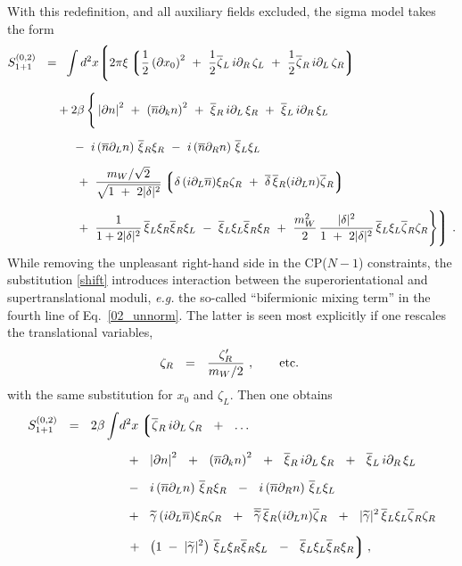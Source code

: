 \documentclass[12pt]{article}
\newcommand{\p}{\partial}
\newcommand{\wt}{\widetilde}
\newcommand{\ov}{\overline}
\newcommand{\lgr}{\left\lgroup}
\newcommand{\rgr}{\right\rgroup}
\newcommand{\bxir}{\ov{\xi}{}_R}
\newcommand{\bxil}{\ov{\xi}{}_L}
\newcommand{\xir}{\xi_R}
\newcommand{\xil}{\xi_L}
\newcommand{\bzl}{\ov{\zeta}{}_L}
\newcommand{\bzr}{\ov{\zeta}{}_R}
\newcommand{\zr}{\zeta_R}
\newcommand{\zl}{\zeta_L}
\newcommand{\nbar}{\ov{n}}
\newcommand{\tgamma}{\wt{\gamma}}
\begin{document}
	With this redefinition, and all auxiliary fields excluded, the sigma model takes the form
\begin{align}
%
\notag
S_{1+1}^{(0,2)} ~~=&~~
	\int d^2 x 
\Biggl\lgroup
	2\pi\xi \lgr \frac 1 2 \left (\p x_0\right)^2 ~+~
		      \frac 1 2 \bzl\, i\p_R\, \zl ~+~
			\frac 1 2 \bzr\, i\p_L\, \zr
		\rgr
	 \\[2mm]
%
\label{02_unnorm}
&
	+2\beta\, \Bigg\{
	\left|\p n\right|^2 ~+~ \left(\ov{n}\p_k n\right)^2 ~+~
	\bxir \, i\p_L \, \xir  ~+~ \bxil \, i\p_R \, \xil \\[2mm]
%
\notag
&
	~~~~
	-~
	i \left(\ov{n}\p_L n\right)\, \bxir \xir ~-~ 
	i \left(\ov{n}\p_R n\right)\, \bxil \xil 
	\\[2mm]
%
\notag
&
	~~~~
	~+~
	\frac{m_W/\sqrt{2}} { \sqrt{ 1~+~2|\delta|^2 } }
	\lgr \delta\, (i\p_L \ov{n}) \xir\zr ~+~ 
             \ov{\delta}\, \bxir (i\p_L n)\bzr 
	\rgr \\[2mm]
%
\notag
&
	~~~~
	~+~ \frac{1}{1 + 2|\delta|^2}\, \bxil\xir \bxir\xil 
	~-~ \bxil\xil\bxir\xir
	~+~
	\frac{m_W^2}{2}\,\frac{|\delta|^2}{1 ~+~ 2|\delta|^2}\,
		\bxil\xil\bzr\zr \Bigg\} 
\Biggr\rgroup~.
\end{align}
	While removing the unpleasant right-hand side in the CP($N-1$) constraints, the
	substitution \eqref{shift} introduces interaction between the superorientational
	and supertranslational moduli, {\it e.g.} the so-called ``bifermionic mixing term''
	in the fourth line of Eq.~\eqref{02_unnorm}.
	The latter is seen most explicitly if one rescales the translational variables,
\[
	\zr ~~=~~ \frac {\zr'}  {{m_W}/{2}}~, \qquad {\rm etc.}~
\]
	with the same substitution for $ x_0 $ and $ \zl $.
	Then one obtains 
\begin{align}
%
\notag
S_{1+1}^{(0,2)} ~~=~~ 2\beta
	\int & d^2 x 
\lgr
	\bzr\, i\p_L\, \zr ~~+~~ \dots 
\right.
	\\[2mm]
%
\label{world02}
	&
	\;\;
	+~~
	\left|\p n\right|^2 ~~+~~ \left(\ov{n}\p_k n\right)^2 ~~+~~
	\bxir \, i\p_L \, \xir  ~~+~~ \bxil \, i\p_R \, \xil 
	\\[2mm]
%
\notag
	&
	\;\;
	-~~
	i \left(\ov{n}\p_L n\right)\, \bxir \xir ~~-~~ 
	i \left(\ov{n}\p_R n\right)\, \bxil \xil  
	\\[2mm]
%
\notag
	&
	\;\;
	+~~
	\tgamma\, (i\p_L\nbar) \xir\zr ~~+~~ \ov{\tgamma}\, \bxir (i\p_L n) \bzr ~~+~~
	|\tgamma|^2\, \bxil\xil \bzr\zr  
	\\[2mm]
%
\notag
	&
	\;\;
\left.
	+~~ 
	\left( 1 \;-\; |\tgamma|^2 \right)\, \bxil\xir \bxir\xil  
	~~-~~ \bxil\xil \bxir\xir
\rgr ,
\end{align}
\end{document}
